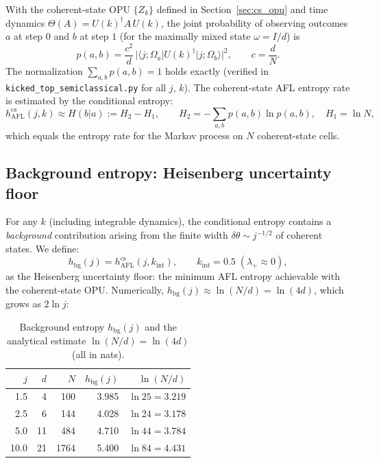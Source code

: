 \documentclass[12pt,a4paper]{article}
\begin{document}
With the coherent-state OPU $\{Z_k\}$ defined in Section~\ref{sec:cs_opu}
and time dynamics $\Theta(A) = U(k)^\dagger A\,U(k)$, the joint
probability of observing outcomes $a$ at step $0$ and $b$ at step $1$
(for the maximally mixed state $\omega = I/d$) is
\begin{equation}
  \label{eq:cs_joint_prob}
  p(a,b) = \frac{c^2}{d}\,|\langle j;\Omega_a|U(k)^\dagger|j;\Omega_b\rangle|^2,
  \qquad
  c = \frac{d}{N}.
\end{equation}
The normalization $\sum_{a,b}p(a,b) = 1$ holds exactly (verified in
\texttt{kicked\_top\_semiclassical.py} for all $j$, $k$).
The coherent-state AFL entropy rate is estimated by the conditional entropy:
\begin{equation}
  \label{eq:h_cs}
  h_{\mathrm{AFL}}^{\mathrm{cs}}(j,k)
  \approx H(b|a) := H_2 - H_1,
  \qquad
  H_2 = -\sum_{a,b} p(a,b)\ln p(a,b),
  \quad
  H_1 = \ln N,
\end{equation}
which equals the entropy rate for the Markov process on $N$ coherent-state
cells.

\subsection{Background entropy: Heisenberg uncertainty floor}

For any $k$ (including integrable dynamics), the conditional entropy
contains a \emph{background} contribution arising from the finite width
$\delta\theta \sim j^{-1/2}$ of coherent states.  We define:
\begin{equation}
  \label{eq:h_bg}
  h_{\mathrm{bg}}(j) = h_{\mathrm{AFL}}^{\mathrm{cs}}(j, k_{\mathrm{int}}),
  \qquad k_{\mathrm{int}} = 0.5 \; (\lambda_+ \approx 0),
\end{equation}
as the Heisenberg uncertainty floor: the minimum AFL entropy achievable
with the coherent-state OPU.  Numerically, $h_{\mathrm{bg}}(j) \approx \ln(N/d) = \ln(4d)$,
which grows as $2\ln j$:

\begin{table}[h!]
\centering
\caption{Background entropy $h_{\mathrm{bg}}(j)$ and the analytical estimate
$\ln(N/d) = \ln(4d)$ (all in nats).}
\label{tab:hbg}
\begin{tabular}{r|rrrr}
\hline
$j$ & $d$ & $N$ & $h_{\mathrm{bg}}(j)$ & $\ln(N/d)$ \\
\hline
1.5 &  4 &  100 & 3.985 & $\ln 25 = 3.219$ \\
2.5 &  6 &  144 & 4.028 & $\ln 24 = 3.178$ \\
5.0 & 11 &  484 & 4.710 & $\ln 44 = 3.784$ \\
10.0& 21 & 1764 & 5.400 & $\ln 84 = 4.431$ \\
\hline
\end{tabular}
\end{table}
\end{document}
